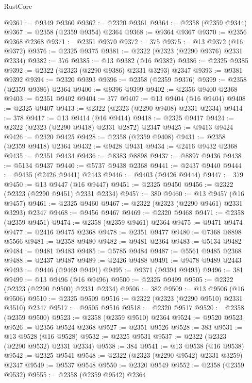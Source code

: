 \begin{lexlean}{RustCore}
\begin{coremodule}
@9361 := @9349 @9360
@9362 := @2320 @9361
@9364 := @2358 (@2359 @9344)
@9367 := @2358 (@2359 @9354) @2364
@9368 := @9364 @9367
@9370 := @2356 @9368 @2368
@9371 := @2351 @9370
@9372 := 375
@9375 := @13 @9372 (@16 @9372)
@9376 := @2325 @9375
@9381 := @2322 (@2323 (@2290 @9376) @2331 @2334)
@9382 := 376
@9385 := @13 @9382 (@16 @9382)
@9386 := @2325 @9385
@9392 := @2322 (@2323 (@2290 @9386) @2331 @3293) @2347
@9393 := @9381 @9392
@9394 := @2320 @9393
@9396 := @2358 (@2359 @9376)
@9399 := @2358 (@2359 @9386) @2364
@9400 := @9396 @9399
@9402 := @2356 @9400 @2368
@9403 := @2351 @9402
@9404 := 377
@9407 := @13 @9404 (@16 @9404)
@9408 := @2325 @9407
@9413 := @2322 (@2323 (@2290 @9408) @2331 @2334)
@9414 := 378
@9417 := @13 @9414 (@16 @9414)
@9418 := @2325 @9417
@9424 := @2322 (@2323 (@2290 @9418) @2331 @2872) @2347
@9425 := @9413 @9424
@9426 := @2320 @9425
@9428 := @2358 (@2359 @9408)
@9431 := @2358 (@2359 @9418) @2364
@9432 := @9428 @9431
@9434 := @2416 @9432 @2368
@9435 := @2351 @9434
@9436 := @8383 @8898
@9437 := @8897 @9436
@9438 := @5134 @9437
@9440 := @5737 @9438 @2368
@9441 := @2437 @9440
@9444 := @9435 (@2426 @9441) @2443
@9446 := @9403 (@9426 @9444)
@9447 := 379
@9450 := @13 @9447 (@16 @9447)
@9451 := @2325 @9450
@9456 := @2322 (@2323 (@2290 @9451) @2331 @2334)
@9457 := 380
@9460 := @13 @9457 (@16 @9457)
@9461 := @2325 @9460
@9467 := @2322 (@2323 (@2290 @9461) @2331 @3293) @2347
@9468 := @9456 @9467
@9469 := @2320 @9468
@9471 := @2358 (@2359 @9451)
@9474 := @2358 (@2359 @9461) @2364
@9475 := @9471 @9474
@9477 := @2416 @9475 @2368
@9478 := @2351 @9477
@9480 := @7368 @8898 @5566
@9481 := @2358 @9480
@9482 := @9481 @2364
@9483 := @5134 @9482
@9484 := @9481 @9483
@9485 := @5785 @9484
@9487 := @5561 @9485 @2368
@9488 := @2437 @9487
@9489 := @2426 @9488
@9491 := @9478 @9489 @2443
@9493 := @9446 (@9469 @9491)
@9495 := @9371 (@9394 @9493)
@9496 := 381
@9499 := @13 @9496 (@16 @9496)
@9500 := @2325 @9499
@9505 := @2322 (@2323 (@2290 @9500) @2331 @2334)
@9506 := 382
@9509 := @13 @9506 (@16 @9506)
@9510 := @2325 @9509
@9516 := @2322 (@2323 (@2290 @9510) @2331 @3510) @2347
@9517 := @9505 @9516
@9518 := @2320 @9517
@9520 := @2358 (@2359 @9500)
@9523 := @2358 (@2359 @9510) @2364
@9524 := @9520 @9523
@9526 := @2356 @9524 @2368
@9527 := @2351 @9526
@9528 := 383
@9531 := @13 @9528 (@16 @9528)
@9532 := @2325 @9531
@9537 := @2322 (@2323 (@2290 @9532) @2331 @2334)
@9538 := 384
@9541 := @13 @9538 (@16 @9538)
@9542 := @2325 @9541
@9548 := @2322 (@2323 (@2290 @9542) @2331 @3259) @2347
@9549 := @9537 @9548
@9550 := @2320 @9549
@9552 := @2358 (@2359 @9532)
@9555 := @2358 (@2359 @9542) @2364

\end{coremodule}
\end{lexlean}
